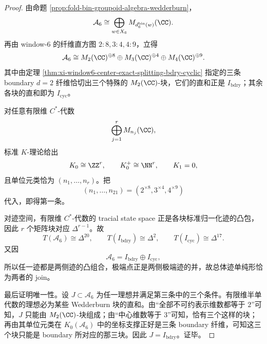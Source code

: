 \begin{proof}
由命题 \ref{prop:fold-bin-groupoid-algebra-wedderburn}，
\[
\mathcal A_6
\cong
\bigoplus_{w\in X_6}M_{d_6^{\mathrm{bin}}(w)}(\CC).
\]
再由 window-\(6\) 的纤维直方图 \(2:8,3:4,4:9\)，立得
\[
\mathcal A_6
\cong
M_2(\CC)^{\oplus 8}\oplus M_3(\CC)^{\oplus 4}\oplus M_4(\CC)^{\oplus 9}.
\]
其中由定理 \ref{thm:xi-window6-center-exact-splitting-bdry-cyclic} 指定的三条 boundary \(d=2\) 纤维恰切出三个特殊的 \(M_2(\CC)\)-块，它们的直和正是 \(I_{\mathrm{bdry}}\)；其余各块的直和即为 \(I_{\mathrm{cyc}}\)。

对任意有限维 \(C^\ast\)-代数
\[
\bigoplus_{j=1}^r M_{n_j}(\CC),
\]
标准 \(K\)-理论给出
\[
K_0\cong \ZZ^r,
\qquad
K_0^+\cong \NN^r,
\qquad
K_1=0,
\]
且单位元类恰为 \((n_1,\dots,n_r)\)。把
\[
(n_1,\dots,n_{21})=(2^{\times 8},3^{\times 4},4^{\times 9})
\]
代入，即得第一条。

对迹空间，有限维 \(C^\ast\)-代数的 tracial state space 正是各块标准归一化迹的凸包，因此 \(r\) 个矩阵块对应 \(\Delta^{r-1}\)。故
\[
T(\mathcal A_6)\cong \Delta^{20},
\qquad
T(I_{\mathrm{bdry}})\cong \Delta^2,
\qquad
T(I_{\mathrm{cyc}})\cong \Delta^{17}.
\]
又因
\[
\mathcal A_6=I_{\mathrm{bdry}}\oplus I_{\mathrm{cyc}},
\]
所以任一迹都是两侧迹的凸组合，极端点正是两侧极端迹的并，故总体迹单纯形恰为两者的 join。

最后证明唯一性。设 \(J\subset \mathcal A_6\) 为任一理想并满足第三条中的三个条件。有限维半单代数的理想必为某些 Wedderburn 块的直和。由“全部不可约表示维数都等于 \(2\)”可知，\(J\) 只能由 \(M_2(\CC)\)-块组成；由“中心维数等于 \(3\)”可知，恰有三个这样的块；再由其单位元类在 \(K_0(\mathcal A_6)\) 中的坐标支撑正好是三条 boundary 纤维，可知这三个块只能是 boundary 所对应的那三块。因此 \(J=I_{\mathrm{bdry}}\)。证毕。
\end{proof}
